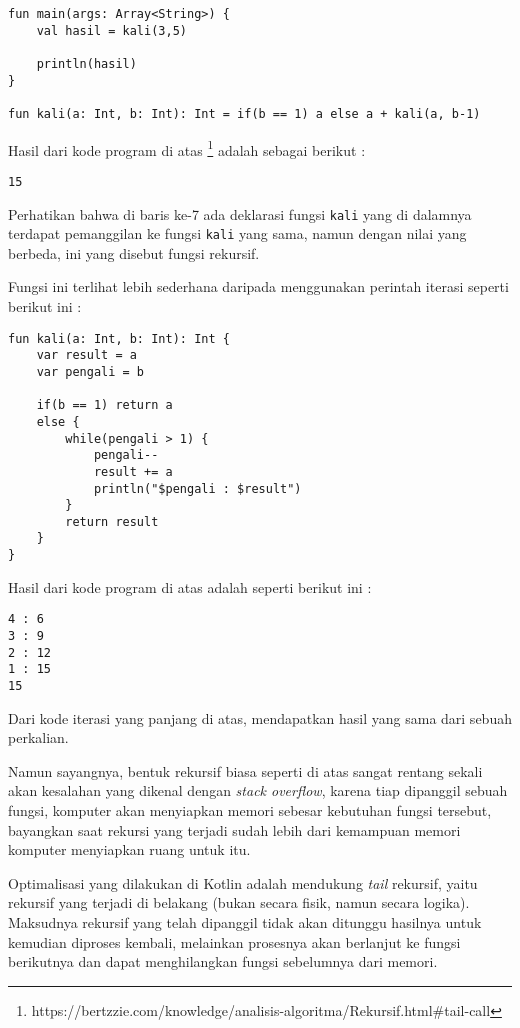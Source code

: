 \begin{lstlisting}
fun main(args: Array<String>) {
	val hasil = kali(3,5)
	
	println(hasil)
}

fun kali(a: Int, b: Int): Int = if(b == 1) a else a + kali(a, b-1)
\end{lstlisting}

Hasil dari kode program di atas \footnote{https://bertzzie.com/knowledge/analisis-algoritma/Rekursif.html\#tail-call} adalah sebagai berikut :

\begin{lstlisting}
15
\end{lstlisting}

Perhatikan bahwa di baris ke-7 ada deklarasi fungsi \texttt{kali} yang di dalamnya terdapat pemanggilan ke fungsi \texttt{kali} yang sama, namun dengan nilai yang berbeda, ini yang disebut fungsi rekursif.

Fungsi ini terlihat lebih sederhana daripada menggunakan perintah iterasi seperti berikut ini :

\begin{lstlisting}
fun kali(a: Int, b: Int): Int {
	var result = a
	var pengali = b
	
	if(b == 1) return a
	else {
		while(pengali > 1) {
			pengali--
			result += a
			println("$pengali : $result")
		}
		return result
	}
}
\end{lstlisting}

Hasil dari kode program di atas adalah seperti berikut ini :

\begin{lstlisting}
4 : 6
3 : 9
2 : 12
1 : 15
15
\end{lstlisting}

Dari kode iterasi yang panjang di atas, mendapatkan hasil yang sama dari sebuah perkalian.

Namun sayangnya, bentuk rekursif biasa seperti di atas sangat rentang sekali akan kesalahan yang dikenal dengan \textit{stack overflow}, karena tiap dipanggil sebuah fungsi, komputer akan menyiapkan memori sebesar kebutuhan fungsi tersebut, bayangkan saat rekursi yang terjadi sudah lebih dari kemampuan memori komputer menyiapkan ruang untuk itu.

Optimalisasi yang dilakukan di Kotlin adalah mendukung \textit{tail} rekursif, yaitu rekursif yang terjadi di belakang (bukan secara fisik, namun secara logika). Maksudnya rekursif yang telah dipanggil tidak akan ditunggu hasilnya untuk kemudian diproses kembali, melainkan prosesnya akan berlanjut ke fungsi berikutnya dan dapat menghilangkan fungsi sebelumnya dari memori.


